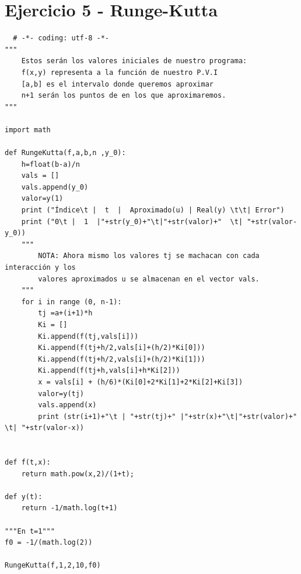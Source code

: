 \documentclass[11pt]{article}
\begin{document}
\section{Ejercicio 5 - Runge-Kutta }
\begin{lstlisting}
  # -*- coding: utf-8 -*-
"""
    Estos serán los valores iniciales de nuestro programa:
    f(x,y) representa a la función de nuestro P.V.I
    [a,b] es el intervalo donde queremos aproximar
    n+1 serán los puntos de en los que aproximaremos.
"""

import math

def RungeKutta(f,a,b,n ,y_0):
    h=float(b-a)/n
    vals = []
    vals.append(y_0)
    valor=y(1)
    print ("Índice\t |  t  |  Aproximado(u) | Real(y) \t\t| Error")
    print ("0\t |  1  |"+str(y_0)+"\t|"+str(valor)+"  \t| "+str(valor-y_0))
    """
        NOTA: Ahora mismo los valores tj se machacan con cada interacción y los
        valores aproximados u se almacenan en el vector vals.
    """
    for i in range (0, n-1):
        tj =a+(i+1)*h
        Ki = []
        Ki.append(f(tj,vals[i]))
        Ki.append(f(tj+h/2,vals[i]+(h/2)*Ki[0]))
        Ki.append(f(tj+h/2,vals[i]+(h/2)*Ki[1]))
        Ki.append(f(tj+h,vals[i]+h*Ki[2]))
        x = vals[i] + (h/6)*(Ki[0]+2*Ki[1]+2*Ki[2]+Ki[3])
        valor=y(tj)
        vals.append(x)
        print (str(i+1)+"\t | "+str(tj)+" |"+str(x)+"\t|"+str(valor)+"  \t| "+str(valor-x))


def f(t,x):
    return math.pow(x,2)/(1+t);

def y(t):
    return -1/math.log(t+1)

"""En t=1"""
f0 = -1/(math.log(2))

RungeKutta(f,1,2,10,f0)
  \end{lstlisting}
\end{document}
